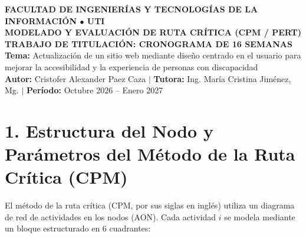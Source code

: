 \documentclass[11pt,a4paper]{article}
\begin{document}
\begin{tcolorbox}[colback=utiNavy, colframe=utiNavy, arc=4pt, colupper=white, boxrule=0pt, left=10pt, right=10pt, top=8pt, bottom=8pt]
\begin{center}
    {\scriptsize\textbf{\color{utiLightBlue}FACULTAD DE INGENIERÍAS Y TECNOLOGÍAS DE LA INFORMACIÓN \quad $\bullet$ \quad UTI}}\\[3pt]
    {\large\textbf{\color{white}MODELADO Y EVALUACIÓN DE RUTA CRÍTICA (CPM / PERT)}}\\[2pt]
    {\small\textbf{\color{utiLightBlue}TRABAJO DE TITULACIÓN: CRONOGRAMA DE 16 SEMANAS}}\\[4pt]
    {\footnotesize\color{white}\textbf{Tema:} Actualización de un sitio web mediante diseño centrado en el usuario para mejorar la accesibilidad y la experiencia de personas con discapacidad}\\
    {\scriptsize\color{utiLightBlue}\textbf{Autor:} Cristofer Alexander Paez Caza \quad $\vert$ \quad \textbf{Tutora:} Ing. María Cristina Jiménez, Mg. \quad $\vert$ \quad \textbf{Período:} Octubre 2026 -- Enero 2027}
\end{center}
\end{tcolorbox}

\vspace{0.3cm}

\section*{\normalsize\color{utiNavy}1. Estructura del Nodo y Parámetros del Método de la Ruta Crítica (CPM)}

El método de la ruta crítica (CPM, por sus siglas en inglés) utiliza un diagrama de red de actividades en los nodos (AON). Cada actividad $i$ se modela mediante un bloque estructurado en 6 cuadrantes:
\end{document}

